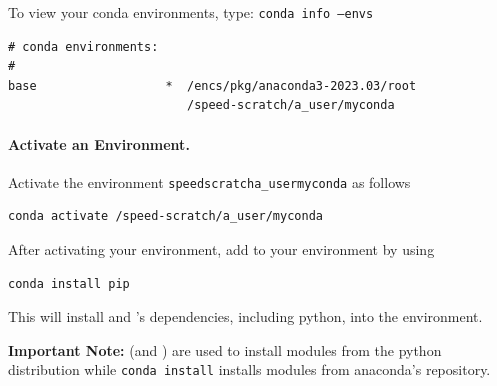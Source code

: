 \documentclass{easychair}
\begin{document}
To view your conda environments, type: \texttt{conda info --envs}

\begin{verbatim}
# conda environments:
#
base                  *  /encs/pkg/anaconda3-2023.03/root
                         /speed-scratch/a_user/myconda
\end{verbatim}      

\paragraph{Activate an Environment.}

Activate the environment \texttt{\/speed\-scratch\/a\_user\/myconda} as follows
\begin{verbatim}
conda activate /speed-scratch/a_user/myconda
\end{verbatim}
After activating your environment, add  to your environment by using 
\begin{verbatim}
conda install pip
\end{verbatim}
This will install  and 's dependencies, including python, 
into the environment.


\noindent
\textbf{Important Note:}  (and ) are used to install modules
from the python distribution while \texttt{conda install} installs modules from 
anaconda's repository.

\end{document}

